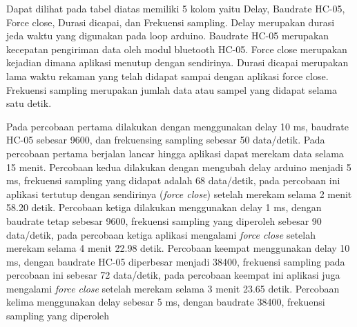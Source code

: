 Dapat dilihat pada tabel diatas memiliki 5 kolom yaitu Delay, Baudrate HC-05, Force close, Durasi dicapai, dan Frekuensi sampling. Delay merupakan durasi jeda waktu yang digunakan pada loop arduino. Baudrate HC-05 merupakan kecepatan pengiriman data oleh modul bluetooth HC-05. Force close merupakan kejadian dimana aplikasi menutup dengan sendirinya. Durasi dicapai merupakan lama waktu rekaman yang telah didapat sampai dengan aplikasi force close. Frekuensi sampling merupakan jumlah data atau sampel yang didapat selama satu detik.

Pada percobaan pertama dilakukan dengan menggunakan delay 10 ms, baudrate HC-05 sebesar 9600, dan frekuensing sampling sebesar 50 data/detik. Pada percobaan pertama berjalan lancar hingga aplikasi dapat merekam data selama 15 menit. Percobaan kedua dilakukan dengan mengubah delay arduino menjadi 5 ms, frekuensi sampling yang didapat adalah 68 data/detik, pada percobaan ini aplikasi tertutup dengan sendirinya (\textit{force close}) setelah merekam selama 2 menit 58.20 detik. Percobaan ketiga dilakukan menggunakan delay 1 ms, dengan baudrate tetap sebesar 9600, frekuensi sampling yang diperoleh sebesar 90 data/detik, pada percobaan ketiga aplikasi mengalami \textit{force close} setelah merekam selama 4 menit 22.98 detik. Percobaan keempat menggunakan delay 10 ms, dengan baudrate HC-05 diperbesar menjadi 38400, frekuensi sampling pada percobaan ini sebesar 72 data/detik, pada percobaan keempat ini aplikasi juga mengalami \textit{force close} setelah merekam selama 3 menit 23.65 detik. Percobaan kelima menggunakan delay sebesar 5 ms, dengan baudrate 38400, frekuensi sampling yang diperoleh
